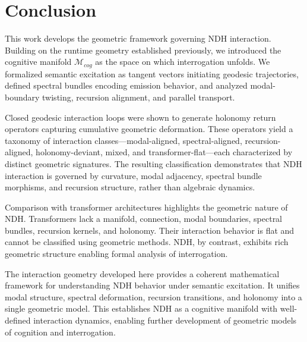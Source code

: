 \section{Conclusion}
\label{sec:conclusion}

This work develops the geometric framework governing NDH interaction. Building
on the runtime geometry established previously, we introduced the cognitive
manifold $\mathcal{M}_{cog}$ as the space on which interrogation unfolds. We
formalized semantic excitation as tangent vectors initiating geodesic
trajectories, defined spectral bundles encoding emission behavior, and analyzed
modal-boundary twisting, recursion alignment, and parallel transport.

Closed geodesic interaction loops were shown to generate holonomy return
operators capturing cumulative geometric deformation. These operators yield a
taxonomy of interaction classes—modal-aligned, spectral-aligned,
recursion-aligned, holonomy-deviant, mixed, and transformer-flat—each
characterized by distinct geometric signatures. The resulting classification
demonstrates that NDH interaction is governed by curvature, modal adjacency,
spectral bundle morphisms, and recursion structure, rather than algebraic
dynamics.

Comparison with transformer architectures highlights the geometric nature of
NDH. Transformers lack a manifold, connection, modal boundaries, spectral
bundles, recursion kernels, and holonomy. Their interaction behavior is flat
and cannot be classified using geometric methods. NDH, by contrast, exhibits
rich geometric structure enabling formal analysis of interrogation.

The interaction geometry developed here provides a coherent mathematical
framework for understanding NDH behavior under semantic excitation. It unifies
modal structure, spectral deformation, recursion transitions, and holonomy into
a single geometric model. This establishes NDH as a cognitive manifold with
well-defined interaction dynamics, enabling further development of geometric
models of cognition and interrogation.
